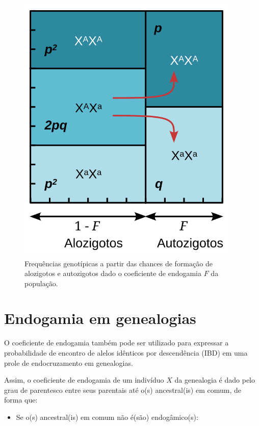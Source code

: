 \documentclass[
]{book}
\providecommand{\tightlist}{%
  \setlength{\itemsep}{0pt}\setlength{\parskip}{0pt}}
\begin{document}
\begin{figure}

{\centering \includegraphics[width=400px]{figs/punnet_inbreeding} 

}

\caption{Frequências genotípicas a partir das chances de formação de alozigotos e autozigotos dado o coeficiente de endogamia $F$ da população.}\label{fig:punnetinbreeding}
\end{figure}

\hypertarget{endogamia-em-genealogias}{%
\section{Endogamia em genealogias}\label{endogamia-em-genealogias}}

O coeficiente de endogamia também pode ser utilizado para expressar a probabilidade de encontro de alelos idênticos por descendência (IBD) em uma prole de endocruzamento em genealogias.

Assim, o coeficiente de endogamia de um indivíduo \(X\) da genealogia é dado pelo grau de parentesco entre seus parentais até o(s) ancestral(is) em comum, de forma que:

\begin{itemize}
\tightlist
\item
  Se o(s) ancestral(is) em comum não é(são) endogâmico(s):
\end{itemize}
\end{document}
